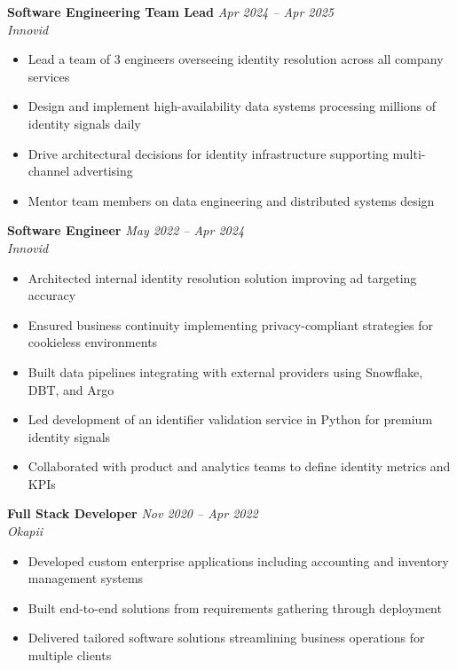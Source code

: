 \documentclass[10pt,a4paper]{article}
\newcommand{\cventry}[3]{%
  \textbf{#1} \hfill \textit{#3}\\[3pt]
  \textit{#2}%
}
\begin{document}
\cventry{Software Engineering Team Lead}{Innovid}{Apr 2024 -- Apr 2025}
\begin{itemize}[leftmargin=*, noitemsep, topsep=3pt, itemsep=2pt]
  \item Lead a team of 3 engineers overseeing identity resolution
        across all company services
  \item Design and implement high-availability data systems processing
        millions of identity signals daily
  \item Drive architectural decisions for identity infrastructure
        supporting multi-channel advertising
  \item Mentor team members on data engineering and distributed
        systems design
\end{itemize}

\vspace{0.25cm}

\cventry{Software Engineer}{Innovid}{May 2022 -- Apr 2024}
\begin{itemize}[leftmargin=*, noitemsep, topsep=3pt, itemsep=2pt]
  \item Architected internal identity resolution solution improving
        ad targeting accuracy
  \item Ensured business continuity implementing privacy-compliant
        strategies for cookieless environments
  \item Built data pipelines integrating with external providers
        using Snowflake, DBT, and Argo
  \item Led development of an identifier validation service in Python
        for premium identity signals
  \item Collaborated with product and analytics teams to define
        identity metrics and KPIs
\end{itemize}

\vspace{0.25cm}

\cventry{Full Stack Developer}{Okapii}{Nov 2020 -- Apr 2022}
\begin{itemize}[leftmargin=*, noitemsep, topsep=3pt, itemsep=2pt]
  \item Developed custom enterprise applications including accounting
        and inventory management systems
  \item Built end-to-end solutions from requirements gathering through
        deployment
  \item Delivered tailored software solutions streamlining business
        operations for multiple clients
\end{itemize}
\end{document}
